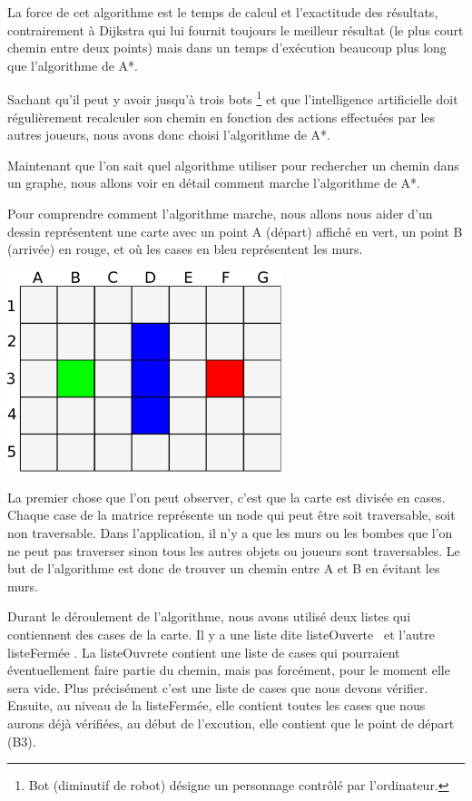 			La force de cet algorithme est le temps de calcul et l'exactitude des résultats, contrairement à Dijkstra qui lui fournit toujours le meilleur résultat (le plus court chemin entre deux points) mais dans un temps d'exécution beaucoup plus long que l'algorithme de A*.
			
			Sachant qu'il peut y avoir jusqu'à trois bots \footnote{Bot (diminutif de robot) désigne un personnage contrôlé par l'ordinateur.} et que l'intelligence artificielle doit régulièrement recalculer son chemin en fonction des actions effectuées par les autres joueurs, nous avons donc choisi l'algorithme de A*.
		
			Maintenant que l'on sait quel algorithme utiliser pour rechercher un chemin dans un graphe, nous allons voir en détail comment marche l'algorithme de A*.
		
			Pour comprendre comment l'algorithme marche, nous allons nous aider d'un
			dessin représentent une carte avec un point A (départ) affiché en vert, un
			point B (arrivée) en rouge, et où les cases en bleu représentent les murs.
		
			\begin{center}
				\includegraphics[width=8cm]{./Analyse/Img/Grille.eps}
			\end{center}
		
			La premier chose que l'on peut observer, c'est que la carte est divisée en
			cases. Chaque case de la matrice représente un node qui peut être soit
			traversable, soit non traversable. Dans l'application, il n'y a que les murs
			ou les bombes que l'on ne peut pas traverser sinon tous les autres objets
			ou joueurs sont traversables. Le but de l'algorithme est donc de
			trouver un chemin entre A et B en évitant les murs.
			
		
			Durant le déroulement de l'algorithme, nous avons utilisé deux listes qui contiennent des cases de la carte.
			Il y a une liste dite \og listeOuverte \fg \, et l'autre \og listeFermée \fg.
			La listeOuvrete contient une liste de cases qui pourraient éventuellement faire partie du chemin, mais pas forcément, pour le moment elle sera vide.
			Plus précisément c'est une liste de cases que nous devons vérifier.
			Ensuite, au niveau de la listeFermée, elle contient toutes les cases que nous
			aurons déjà vérifiées, au début de l'excution, elle contient que le point de départ (B3).
			
